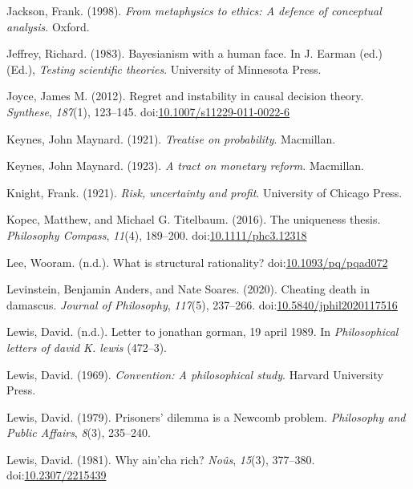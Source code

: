 \documentclass[
  12pt,
  letterpaper,
  DIV=11,
  numbers=noendperiod]{scrreprt}
\newlength{\cslhangindent}
\newenvironment{CSLReferences}[2] %
 {\begin{list}{}{%
  \setlength{\itemindent}{0pt}
  \setlength{\leftmargin}{0pt}
  \setlength{\parsep}{0pt}
  \ifodd #1
   \setlength{\leftmargin}{\cslhangindent}
   \setlength{\itemindent}{-1\cslhangindent}
  \fi
  \setlength{\itemsep}{#2\baselineskip}}}
 {\end{list}}
\begin{document}
\begin{CSLReferences}{1}{0}
Jackson, Frank. (1998). \emph{From metaphysics to ethics: A defence of
conceptual analysis}. Oxford.

Jeffrey, Richard. (1983). Bayesianism with a human face. In J. Earman
(ed.) (Ed.), \emph{Testing scientific theories}. University of Minnesota
Press.

Joyce, James M. (2012). Regret and instability in causal decision
theory. \emph{Synthese}, \emph{187}(1), 123--145.
doi:\href{https://doi.org/10.1007/s11229-011-0022-6}{10.1007/s11229-011-0022-6}

Keynes, John Maynard. (1921). \emph{Treatise on probability}. Macmillan.

Keynes, John Maynard. (1923). \emph{A tract on monetary reform}.
Macmillan.

Knight, Frank. (1921). \emph{Risk, uncertainty and profit}. University
of Chicago Press.

Kopec, Matthew, and Michael G. Titelbaum. (2016). The uniqueness thesis.
\emph{Philosophy Compass}, \emph{11}(4), 189--200.
doi:\href{https://doi.org/10.1111/phc3.12318}{10.1111/phc3.12318}

Lee, Wooram. (n.d.). What is structural rationality?
doi:\href{https://doi.org/10.1093/pq/pqad072}{10.1093/pq/pqad072}

Levinstein, Benjamin Anders, and Nate Soares. (2020). Cheating death in
damascus. \emph{Journal of Philosophy}, \emph{117}(5), 237--266.
doi:\href{https://doi.org/10.5840/jphil2020117516}{10.5840/jphil2020117516}

Lewis, David. (n.d.). Letter to jonathan gorman, 19 april 1989. In
\emph{Philosophical letters of david {K}. lewis} (472--3).

Lewis, David. (1969). \emph{Convention: A philosophical study}. Harvard
University Press.

Lewis, David. (1979). Prisoners' dilemma is a {N}ewcomb problem.
\emph{Philosophy and Public Affairs}, \emph{8}(3), 235--240.

Lewis, David. (1981). Why ain'cha rich? \emph{No{û}s}, \emph{15}(3),
377--380. doi:\href{https://doi.org/10.2307/2215439}{10.2307/2215439}


\end{CSLReferences}
\end{document}
